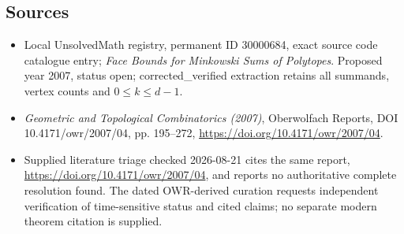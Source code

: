 \documentclass[11pt]{article}
\begin{document}
\subsection{Sources}
\begin{itemize}
\item Local UnsolvedMath registry, permanent ID 30000684, exact source code catalogue entry; \emph{Face Bounds for Minkowski Sums of Polytopes}. Proposed year 2007, status open; corrected\_verified extraction retains all summands, vertex counts and $0\leq k\leq d-1$.
\item \emph{Geometric and Topological Combinatorics (2007)}, Oberwolfach Reports, DOI 10.4171/owr/2007/04, pp. 195--272, \url{https://doi.org/10.4171/owr/2007/04}.
\item Supplied literature triage checked 2026-08-21 cites the same report, \url{https://doi.org/10.4171/owr/2007/04}, and reports no authoritative complete resolution found. The dated OWR-derived curation requests independent verification of time-sensitive status and cited claims; no separate modern theorem citation is supplied.
\end{itemize}
\end{document}
